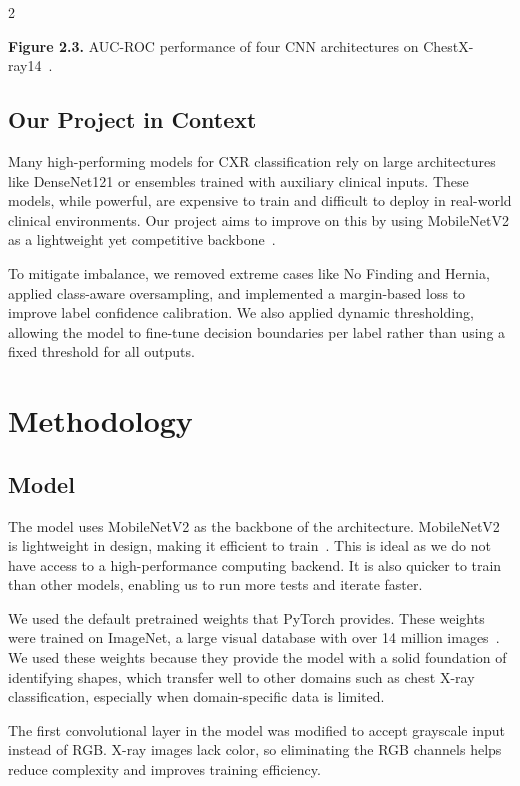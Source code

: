 \documentclass[12pt]{article}
\begin{document}
\begin{multicols}{2}
\begin{center}
    \textbf{Figure 2.3.} AUC-ROC performance of four CNN architectures on ChestX-ray14~\cite{wang2017chestx}.
\end{center}

\subsection{Our Project in Context}

Many high-performing models for CXR classification rely on large architectures like DenseNet121 or ensembles trained with auxiliary clinical inputs. These models, while powerful, are expensive to train and difficult to deploy in real-world clinical environments. Our project aims to improve on this by using MobileNetV2 as a lightweight yet competitive backbone~\cite{sandler2018mobilenetv2}.

To mitigate imbalance, we removed extreme cases like No Finding and Hernia, applied class-aware oversampling, and implemented a margin-based loss to improve label confidence calibration. We also applied dynamic thresholding, allowing the model to fine-tune decision boundaries per label rather than using a fixed threshold for all outputs.

\section{Methodology} \label{sec:method}

\subsection{Model}

The model uses MobileNetV2 as the backbone of the architecture. MobileNetV2 is lightweight in design, making it efficient to train~\cite{howard2019mobilenetv2}. This is ideal as we do not have access to a high-performance computing backend. It is also quicker to train than other models, enabling us to run more tests and iterate faster.

We used the default pretrained weights that PyTorch provides. These weights were trained on ImageNet, a large visual database with over 14 million images~\cite{imagenet}. We used these weights because they provide the model with a solid foundation of identifying shapes, which transfer well to other domains such as chest X-ray classification, especially when domain-specific data is limited.

The first convolutional layer in the model was modified to accept grayscale input instead of RGB. X-ray images lack color, so eliminating the RGB channels helps reduce complexity and improves training efficiency.


\end{multicols}
\end{document}
